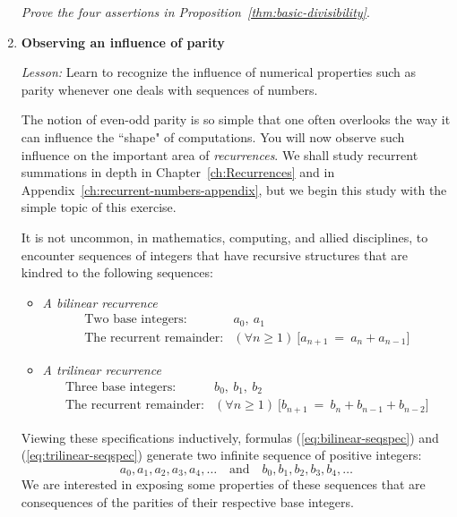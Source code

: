 \begin{enumerate}
{\em Prove the four assertions in Proposition~\ref{thm:basic-divisibility}}.
\smallskip

\medskip\item
{\bf Observing an influence of parity}

{\em Lesson:} Learn to recognize the influence of numerical properties such as parity whenever one deals with sequences of numbers.

\smallskip

The notion of even-odd parity is so simple that one often overlooks the way it can influence the ``shape" of computations.  You will now observe such influence on the important area of {\em recurrences}.  We shall study recurrent summations in depth in Chapter~\ref{ch:Recurrences} and in Appendix~\ref{ch:recurrent-numbers-appendix}, but we begin this study with the simple topic of this exercise.

\medskip

It is not uncommon, in mathematics, computing, and allied disciplines, to encounter sequences of integers that have recursive structures that are kindred to the following sequences:
\begin{itemize}
\item
{\em A bilinear recurrence}
\begin{equation}
\label{eq:bilinear-seqspec}
\begin{array}{ll}
\mbox{Two base integers:} & a_0, \ a_1 \\
\mbox{The recurrent remainder:} &
(\forall n \geq 1) \ \big[ a_{n+1} \ = \ a_n + a_{n-1} \big]
\end{array}
\end{equation}

\medskip\item
{\em A trilinear recurrence}
\begin{equation}
\label{eq:trilinear-seqspec}
 \begin{array}{ll}
\mbox{Three base integers:} & b_0, \ b_1, \ b_2 \\
\mbox{The recurrent remainder:} &
(\forall n \geq 1) \ \big[ b_{n+1} \ = \ b_n + b_{n-1} + b_{n-2} \big]
\end{array}
\end{equation}
\end{itemize}
Viewing these specifications inductively, formulas (\ref{eq:bilinear-seqspec}) and (\ref{eq:trilinear-seqspec}) generate two infinite sequence of positive integers:
\[ a_0, a_1, a_2, a_3, a_4, \ldots \ \ \ \mbox{ and } \ \ \ b_0, b_1, b_2, b_3, b_4, \ldots \]
We are interested in exposing some properties of these sequences that are consequences of the parities of their respective base integers.


\end{enumerate}
